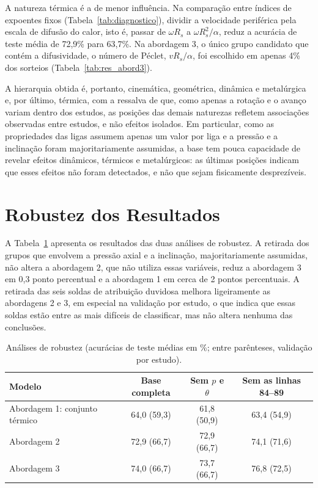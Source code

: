 \documentclass[12pt,openany]{report}
\begin{document}
A natureza térmica é a de menor influência. Na comparação entre índices de expoentes fixos (Tabela~\ref{tab:diagnostico}), dividir a velocidade periférica pela escala de difusão do calor, isto é, passar de $\omega R_s$ a $\omega R_{s}^{2}/\alpha$, reduz a acurácia de teste média de 72,9\% para 63,7\%. Na abordagem 3, o único grupo candidato que contém a difusividade, o número de Péclet, $vR_s/\alpha$, foi escolhido em apenas 4\% dos sorteios (Tabela~\ref{tab:res_abord3}).

A hierarquia obtida é, portanto, cinemática, geométrica, dinâmica e metalúrgica e, por último, térmica, com a ressalva de que, como apenas a rotação e o avanço variam dentro dos estudos, as posições das demais naturezas refletem associações observadas entre estudos, e não efeitos isolados. Em particular, como as propriedades das ligas assumem apenas um valor por liga e a pressão e a inclinação foram majoritariamente assumidas, a base tem pouca capacidade de revelar efeitos dinâmicos, térmicos e metalúrgicos: as últimas posições indicam que esses efeitos não foram detectados, e não que sejam fisicamente desprezíveis.

\section{Robustez dos Resultados}
\label{sec:robustez}

A Tabela~\ref{tab:robustez} apresenta os resultados das duas análises de robustez. A retirada dos grupos que envolvem a pressão axial e a inclinação, majoritariamente assumidas, não altera a abordagem 2, que não utiliza essas variáveis, reduz a abordagem 3 em 0,3 ponto percentual e a abordagem 1 em cerca de 2 pontos percentuais. A retirada das seis soldas de atribuição duvidosa melhora ligeiramente as abordagens 2 e 3, em especial na validação por estudo, o que indica que essas soldas estão entre as mais difíceis de classificar, mas não altera nenhuma das conclusões.

\begin{table}[htbp]
\centering
\caption{Análises de robustez (acurácias de teste médias em \%; entre parênteses, validação por estudo).}
\label{tab:robustez}
\small
\begin{tabular}{lccc}
\toprule
\textbf{Modelo} & \textbf{Base completa} & \textbf{Sem $p$ e $\theta$} & \textbf{Sem as linhas 84--89} \\ \midrule
Abordagem 1: conjunto térmico & 64,0 (59,3) & 61,8 (50,9) & 63,4 (54,9) \\
Abordagem 2 & 72,9 (66,7) & 72,9 (66,7) & 74,1 (71,6) \\
Abordagem 3 & 74,0 (66,7) & 73,7 (66,7) & 76,8 (72,5) \\ \bottomrule
\end{tabular}
\end{table}
\end{document}
